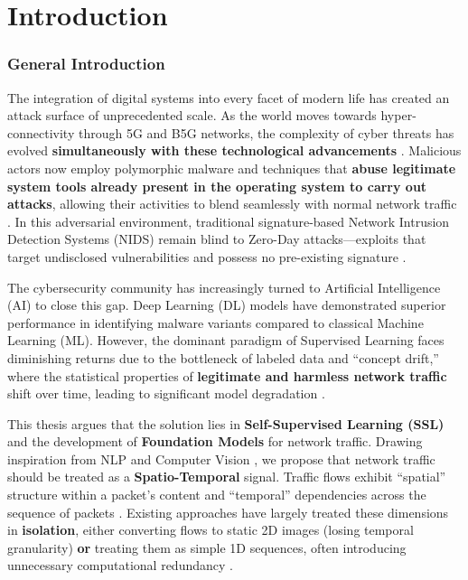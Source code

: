 \documentclass[12pt, a4paper]{report}
\begin{document}
\part{Introduction}

\section*{General Introduction}

The integration of digital systems into every facet of modern life has created an attack surface of unprecedented scale. As the world moves towards hyper-connectivity through 5G and B5G networks, the complexity of cyber threats has evolved \textbf{simultaneously with these technological advancements} \cite{sharafaldin2018toward}. Malicious actors now employ polymorphic malware and techniques that \textbf{abuse legitimate system tools already present in the operating system to carry out attacks}, allowing their activities to blend seamlessly with normal network traffic \cite{jordaney2017transcend}. In this adversarial environment, traditional signature-based Network Intrusion Detection Systems (NIDS) remain blind to Zero-Day attacks—exploits that target undisclosed vulnerabilities and possess no pre-existing signature \cite{buczak2016survey}.

The cybersecurity community has increasingly turned to Artificial Intelligence (AI) to close this gap. Deep Learning (DL) models have demonstrated superior performance in identifying malware variants compared to classical Machine Learning (ML). However, the dominant paradigm of Supervised Learning faces diminishing returns due to the bottleneck of labeled data \cite{liu2024self} and ``concept drift,'' where the statistical properties of \textbf{legitimate and harmless network traffic} shift over time, leading to significant model degradation \cite{gama2014survey}.

This thesis argues that the solution lies in \textbf{Self-Supervised Learning (SSL)} and the development of \textbf{Foundation Models} for network traffic. Drawing inspiration from NLP and Computer Vision \cite{vaswani2017attention, he2022masked}, we propose that network traffic should be treated as a \textbf{Spatio-Temporal} signal. Traffic flows exhibit ``spatial'' structure within a packet's content and ``temporal'' dependencies across the sequence of packets \cite{lin2022etbert}. Existing approaches have largely treated these dimensions in \textbf{isolation}, either converting flows to static 2D images (losing temporal granularity) \textbf{or} treating them as simple 1D sequences, often introducing unnecessary computational redundancy \cite{luis2024no}.
\end{document}
